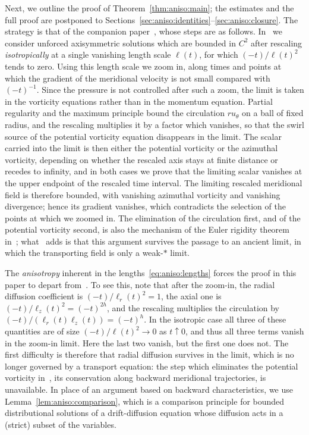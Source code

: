 \documentclass[11pt,reqno]{amsproc}
\numberwithin{equation}{section}
\theoremstyle{remark}
\begin{document}
Next, we outline the proof of Theorem~\ref{thm:aniso:main}; the estimates and the full proof are postponed to Sections~\ref{sec:aniso:identities}--\ref{sec:aniso:closure}. The strategy is that of the companion paper~\cite{CIVEulerLength}, whose steps are as follows. In~\cite{CIVEulerLength} we consider unforced axisymmetric solutions which are bounded in $C^2$ after rescaling \emph{isotropically} at a single vanishing length scale $\ell(t)$, for which $(-t)/\ell(t)^2$ tends to zero. Using this length scale we zoom in, along times and points at which the gradient of the meridional velocity is not small compared with $(-t)^{-1}$. Since the pressure is not controlled after such a zoom, the limit is taken in the vorticity equations rather than in the momentum equation. Partial regularity and the maximum principle bound the circulation $r u_\theta$ on a ball of fixed radius, and the rescaling multiplies it by a factor which vanishes, so that the swirl source of the potential vorticity equation disappears in the limit. The scalar carried into the limit is then either the potential vorticity or the azimuthal vorticity, depending on whether the rescaled axis stays at finite distance or recedes to infinity, and in both cases we prove that the limiting scalar vanishes at the upper endpoint of the rescaled time interval. The limiting rescaled meridional field is therefore bounded, with vanishing azimuthal vorticity and vanishing divergence; hence its gradient vanishes, which contradicts the selection of the points at which we zoomed in. The elimination of the circulation first, and of the potential vorticity second, is also the mechanism of the Euler rigidity theorem in~\cite[Theorem~4.5]{CIV26}; what~\cite{CIVEulerLength} adds is that this argument survives the passage to an ancient limit, in which the transporting field is only a weak-$*$ limit.

The \emph{anisotropy} inherent in the lengths~\eqref{eq:aniso:lengths} forces the proof in this paper to depart from~\cite{CIVEulerLength}. To see this, note that after the zoom-in, the radial diffusion coefficient is $(-t)/\ell_r(t)^2=1$, the axial one is $(-t)/\ell_z(t)^2=(-t)^{2h}$, and the rescaling multiplies the circulation by $(-t)/(\ell_r(t)\ell_z(t))=(-t)^h$. In the isotropic case all three of these quantities are of size $(-t)/\ell(t)^2 \to 0$ as $t\uparrow 0$, and thus all three terms vanish in the zoom-in limit. Here the last two vanish, but the first one does not. The first difficulty is therefore that radial diffusion survives in the limit, which is no longer governed by a transport equation: the step which eliminates the potential vorticity in~\cite{CIV26, CIVEulerLength}, its conservation along backward meridional trajectories, is unavailable. In place of an argument based on backward characteristics, we use Lemma~\ref{lem:aniso:comparison}, which is a comparison principle for bounded distributional solutions of a drift-diffusion equation whose diffusion acts in a (strict) subset of the variables.
\end{document}
